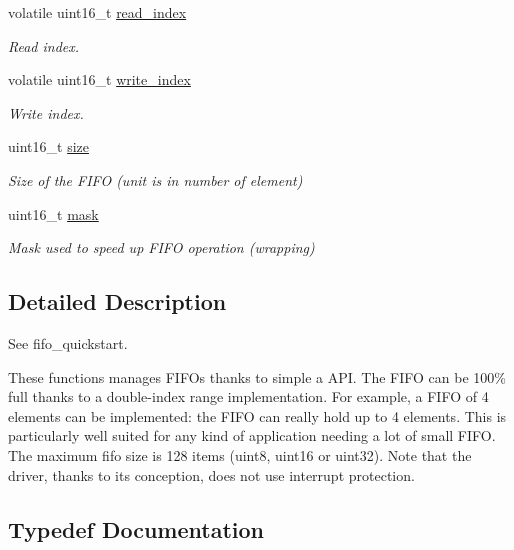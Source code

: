 \begin{DoxyCompactItemize}
\begin{tabbing}
\end{tabbing}\item 
volatile uint16\+\_\+t \mbox{\hyperlink{group__fifo__group_ga926074dbb263b916922202b938daf3ad}{read\+\_\+index}}
\begin{DoxyCompactList}\small\item\em Read index. \end{DoxyCompactList}\item 
volatile uint16\+\_\+t \mbox{\hyperlink{group__fifo__group_gaa10e623e08c4046864b5c1507a97a9ed}{write\+\_\+index}}
\begin{DoxyCompactList}\small\item\em Write index. \end{DoxyCompactList}\item 
uint16\+\_\+t \mbox{\hyperlink{group__fifo__group_gaaba88b24a21a6c70c895c0d55f4a69a0}{size}}
\begin{DoxyCompactList}\small\item\em Size of the F\+I\+FO (unit is in number of \textquotesingle{}element\textquotesingle{}) \end{DoxyCompactList}\item 
uint16\+\_\+t \mbox{\hyperlink{group__fifo__group_ga7fd850d4bb04f7410e8e2abf5f349348}{mask}}
\begin{DoxyCompactList}\small\item\em Mask used to speed up F\+I\+FO operation (wrapping) \end{DoxyCompactList}\end{DoxyCompactItemize}


\subsection{Detailed Description}
See fifo\+\_\+quickstart.

These functions manages F\+I\+F\+Os thanks to simple a A\+PI. The F\+I\+FO can be 100\% full thanks to a double-\/index range implementation. For example, a F\+I\+FO of 4 elements can be implemented\+: the F\+I\+FO can really hold up to 4 elements. This is particularly well suited for any kind of application needing a lot of small F\+I\+FO. The maximum fifo size is 128 items (uint8, uint16 or uint32). Note that the driver, thanks to its conception, does not use interrupt protection. 

\subsection{Typedef Documentation}
\mbox{\label{group__fifo__group_gab18c001ea5c010cc8dfdedb3525f5013}} 
